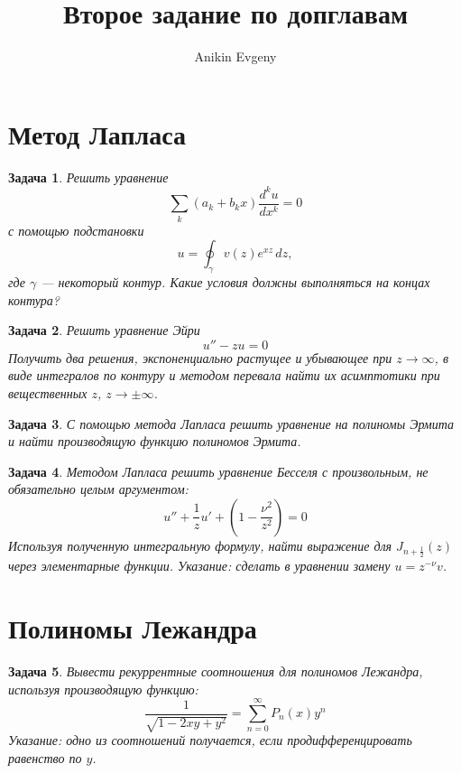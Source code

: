 \documentclass{article}
\title{Второе задание по допглавам}
\author{Anikin Evgeny}
\newtheorem{problem}{Задача}
\begin{document}
\maketitle
\section{Метод Лапласа}
\begin{problem}
    Решить уравнение 
    \begin{equation}
        \sum_k (a_k + b_k x) \frac{d^k u}{d x^k} = 0
    \end{equation}
    с помощью подстановки 
    \begin{equation}
        u = \oint_\gamma v(z) e^{xz} \,dz,
    \end{equation}
    где $\gamma$ --- некоторый контур. Какие условия должны выполняться на концах 
    контура?
\end{problem}
\begin{problem}
    Решить уравнение Эйри
    \begin{equation}
        u'' - zu = 0
    \end{equation}
    Получить два решения, экспоненциально растущее и убывающее при $z \to \infty$,
    в виде интегралов по контуру и методом
    перевала найти их 
    асимптотики при вещественных $z$, $z \to \pm \infty$.
\end{problem}
\begin{problem}
    С помощью метода Лапласа решить уравнение на полиномы Эрмита и найти производящую
    функцию полиномов Эрмита.
\end{problem}
\begin{problem}
    Методом Лапласа решить уравнение Бесселя с произвольным, не обязательно целым 
    аргументом:
    \begin{equation}
        u'' + \frac{1}{z}u' + \left(1 - \frac{\nu^2}{z^2}\right) = 0
    \end{equation}
    Используя полученную интегральную 
    формулу, найти выражение для $J_{n+\frac{1}{2}}(z)$ через элементарные функции.
    \emph{Указание:} сделать в уравнении замену $u = z^{-\nu} v$.
\end{problem}

\section{Полиномы Лежандра}
\begin{problem}
    Вывести рекуррентные соотношения для полиномов Лежандра, используя производящую
    функцию:
    \begin{equation}
        \frac{1}{\sqrt{1 - 2xy + y^2}} = \sum_{n = 0}^\infty P_n(x) y^n
    \end{equation}
    \emph{Указание}: одно из соотношений получается, если продифференцировать равенство
    по $y$.
\end{problem}
    
\end{document}
